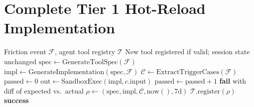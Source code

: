 \section{Complete Tier 1 Hot-Reload Implementation}

\label{app:tier1}

\begin{algorithm}[H]
\caption{Tier 1: Runtime Tool Hot-Reload}
\label{alg:tier1}
\begin{algorithmic}[1]
\Require Friction event $\mathcal{F}$, agent tool registry $\mathcal{T}$
\Ensure New tool registered if valid; session state unchanged
\State $\text{spec} \gets \text{GenerateToolSpec}(\mathcal{F})$
\State $\text{impl} \gets \text{GenerateImplementation}(\text{spec}, \mathcal{F})$
\State $\mathcal{C} \gets \text{ExtractTriggerCases}(\mathcal{F})$
\State $\text{passed} \gets 0$
    \State $\text{out} \gets \text{SandboxExec}(\text{impl}, c.\text{input})$
        \State $\text{passed} \gets \text{passed} + 1$
    \EndIf
\EndFor
{}
    \State \Return \textbf{fail} with diff of expected vs.\ actual
\EndIf
\State $\rho \gets (\text{spec}, \text{impl}, \mathcal{C}, \text{now}(), 7\text{d})$
\State $\mathcal{T}.\text{register}(\rho)$
\State \Return \textbf{success}
\end{algorithmic}
\end{algorithm}

